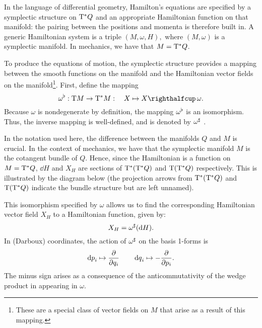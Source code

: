In the language of differential geometry, Hamilton's equations are specified by a symplectic structure on $\mathrm{T}^*Q$ and an appropriate Hamiltonian function on that manifold: the pairing between the positions and momenta is therefore built in. A generic Hamiltonian system is a triple $ (M, \omega, H), $ where $ (M, \omega) $ is a symplectic manifold. In mechanics, we have that $ M = \mathrm{T}^*Q $.

To produce the equations of motion, the symplectic structure provides a mapping between the smooth functions on the manifold and the Hamiltonian vector fields on the manifold\footnote{These are a special class of vector fields on $M$ that arise as a result of this mapping.}. First, define the mapping 
\begin{equation}
    \toDual{\omega}: \tbundle{M} \to \ctbundle{M}:\quad X \mapsto \intpr{X}{\omega}. 
    \label{eq:symplectic_isomorphism}
\end{equation}
Because $\omega$ is nondegenerate by definition, the mapping $\omega^\flat$ is an isomorphism. Thus, the inverse mapping is well-defined, and is denoted by $\omega^\sharp$ \cite{Libermann1987}.

In the notation used here, the difference between the manifolds $Q$ and $M$ is crucial. In the context of mechanics, we have that the symplectic manifold $M$ is the cotangent bundle of $Q$. Hence, since the Hamiltonian is a function on $M = \mathrm{T}^*Q$, $\dd{H}$ and $X_H$ are sections of $\mathrm{T}^*\qty(\mathrm{T}^*Q)$ and $\mathrm{T}\qty(\mathrm{T}^*Q)$ respectively. This is illustrated by the diagram below (the projection arrows from $\mathrm{T}^*\qty(\mathrm{T}^*Q)$ and $\mathrm{T}\qty(\mathrm{T}^*Q)$ indicate the bundle structure but are left unnamed).
\begin{center}
\end{center}
This isomorphism specified by $\omega$ allows us to find the corresponding Hamiltonian vector field $X_H$ to a Hamiltonian function, given by:
\begin{equation} 
    X_H = \omega^\sharp(\dd{H}). 
    \label{eq:symplectic_hamiltonian_vf}
\end{equation}
In (Darboux) coordinates, the action of $ \omega^\sharp$ on the basis 1-forms is  
$$ \dd{p}_i \mapsto \pdv{}{q_i} \qquad \dd{q}_i \mapsto -\pdv{}{p_i}. $$ 
The minus sign arises as a consequence of the anticommutativity of the wedge product in appearing in $\omega$.

